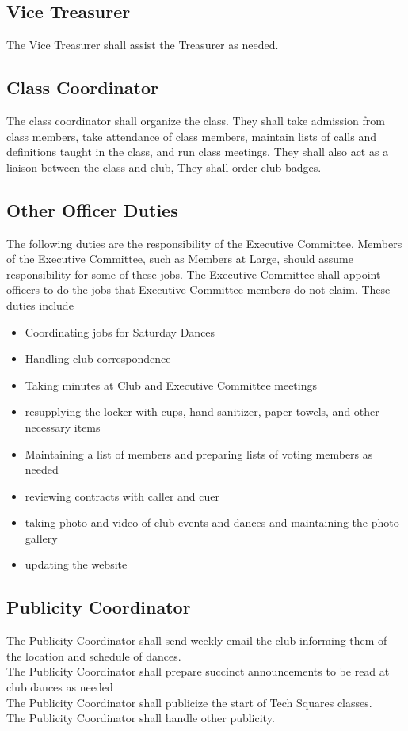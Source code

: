 \documentclass{article}
\begin{document}
\subsection{Vice Treasurer}
The Vice Treasurer shall assist the Treasurer as needed. 
\subsection{Class Coordinator}
The class coordinator shall organize the class. They shall take admission from class members, take attendance of class members, maintain lists of calls and definitions taught in the class, and run class meetings. They shall also act as a liaison between the class and club, They shall order club badges. 
\subsection{Other Officer Duties} The following duties are the responsibility of the Executive Committee. Members of the Executive Committee, such as Members at Large, should assume responsibility for some of these jobs. The Executive Committee shall appoint officers to do the jobs that Executive Committee members do not claim. These duties include \begin{itemize} \item Coordinating jobs for Saturday Dances \item Handling club correspondence \item Taking minutes at Club and Executive Committee meetings \item resupplying the locker with cups, hand sanitizer, paper towels, and other necessary items \item Maintaining a list of members and preparing lists of voting members as needed \item reviewing contracts with caller and cuer \item taking photo and video of club events and dances and maintaining the photo gallery \item updating the website  \end{itemize}
\subsection{Publicity Coordinator}
The Publicity Coordinator shall send weekly email the club informing them of the location and schedule of dances. \\
The Publicity Coordinator shall prepare succinct announcements to be read at club dances as needed\\
The Publicity Coordinator shall publicize the start of Tech Squares classes. \\
The Publicity Coordinator shall handle other publicity. 
\end{document}
